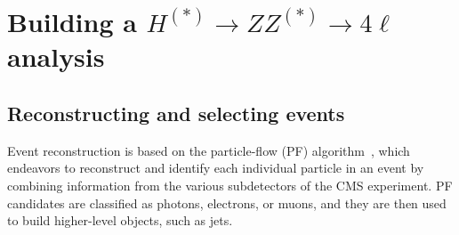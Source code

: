 
\section{Building a $H^{(*)} \to ZZ^{(*)} \to 4\ell$ analysis}

\subsection{Reconstructing and selecting events} \label{sec:recoandsel}



Event reconstruction is based on the particle-flow (PF) algorithm~\cite{Sirunyan:2017ulk}, which endeavors to reconstruct and identify each individual particle in an event by combining information from the various subdetectors of the CMS experiment. PF candidates are classified as photons, electrons, or muons, and they are then used to build higher-level objects, such as jets. 

